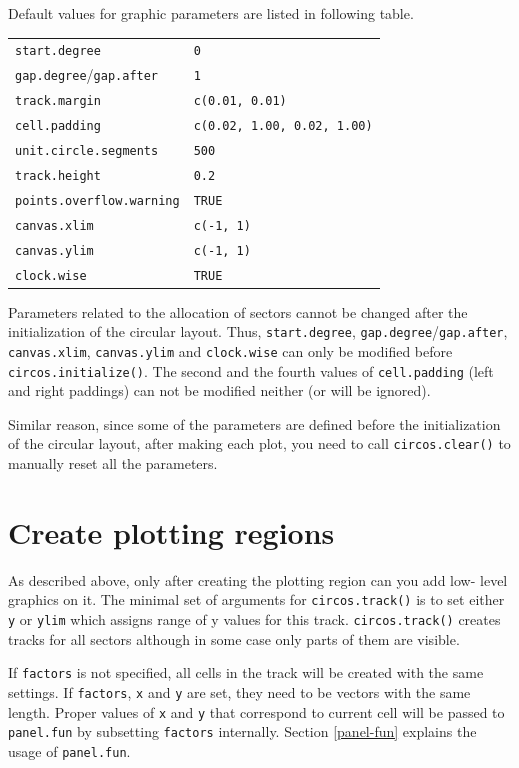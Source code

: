 \documentclass[]{book}
\theoremstyle{definition}
\theoremstyle{definition}
\theoremstyle{remark}
\begin{document}
Default values for graphic parameters are listed in following table.

\begin{longtable}[]{@{}ll@{}}
\toprule
\texttt{start.degree} & \texttt{0}\tabularnewline
\texttt{gap.degree}/\texttt{gap.after} & \texttt{1}\tabularnewline
\texttt{track.margin} & \texttt{c(0.01,\ 0.01)}\tabularnewline
\texttt{cell.padding} &
\texttt{c(0.02,\ 1.00,\ 0.02,\ 1.00)}\tabularnewline
\texttt{unit.circle.segments} & \texttt{500}\tabularnewline
\texttt{track.height} & \texttt{0.2}\tabularnewline
\texttt{points.overflow.warning} & \texttt{TRUE}\tabularnewline
\texttt{canvas.xlim} & \texttt{c(-1,\ 1)}\tabularnewline
\texttt{canvas.ylim} & \texttt{c(-1,\ 1)}\tabularnewline
\texttt{clock.wise} & \texttt{TRUE}\tabularnewline
\bottomrule
\end{longtable}

Parameters related to the allocation of sectors cannot be changed after
the initialization of the circular layout. Thus, \texttt{start.degree},
\texttt{gap.degree}/\texttt{gap.after}, \texttt{canvas.xlim},
\texttt{canvas.ylim} and \texttt{clock.wise} can only be modified before
\texttt{circos.initialize()}. The second and the fourth values of
\texttt{cell.padding} (left and right paddings) can not be modified
neither (or will be ignored).

Similar reason, since some of the parameters are defined before the
initialization of the circular layout, after making each plot, you need
to call \texttt{circos.clear()} to manually reset all the parameters.

\section{Create plotting regions}\label{create-plotting-regions}

As described above, only after creating the plotting region can you add
low- level graphics on it. The minimal set of arguments for
\texttt{circos.track()} is to set either \texttt{y} or \texttt{ylim}
which assigns range of y values for this track. \texttt{circos.track()}
creates tracks for all sectors although in some case only parts of them
are visible.

If \texttt{factors} is not specified, all cells in the track will be
created with the same settings. If \texttt{factors}, \texttt{x} and
\texttt{y} are set, they need to be vectors with the same length. Proper
values of \texttt{x} and \texttt{y} that correspond to current cell will
be passed to \texttt{panel.fun} by subsetting \texttt{factors}
internally. Section \ref{panel-fun} explains the usage of
\texttt{panel.fun}.
\end{document}
